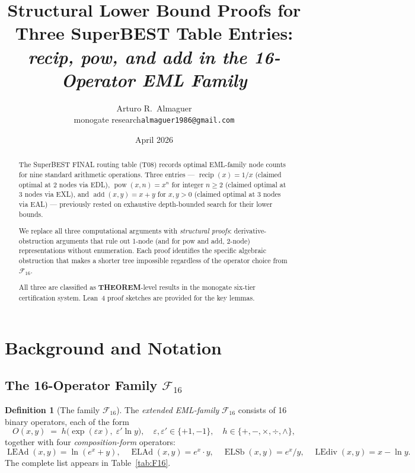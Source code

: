 \documentclass[12pt,a4paper]{article}
\title{Structural Lower Bound Proofs for Three SuperBEST Table Entries:\\
       \large\textit{recip, pow, and add in the 16-Operator EML Family}}
\author{Arturo R.\ Almaguer\\
  \small monogate research\quad\texttt{almaguer1986@gmail.com}}
\date{April 2026}
\theoremstyle{definition}
\newtheorem{definition}[theorem]{Definition}
\newcommand{\ELAd}{\operatorname{ELAd}}
\newcommand{\ELSb}{\operatorname{ELSb}}
\newcommand{\LEAd}{\operatorname{LEAd}}
\newcommand{\LEdiv}{\operatorname{LEdiv}}
\newcommand{\F}{\mathcal{F}_{16}}
\newcommand{\recip}{\operatorname{recip}}
\newcommand{\pow}{\operatorname{pow}}
\newcommand{\add}{\operatorname{add}}
\begin{document}
\maketitle

\begin{abstract}
The SuperBEST FINAL routing table (T08) records optimal EML-family node counts
for nine standard arithmetic operations.  Three entries --- $\recip(x)=1/x$
(claimed optimal at 2 nodes via EDL), $\pow(x,n)=x^n$ for integer $n\geq 2$
(claimed optimal at 3 nodes via EXL), and $\add(x,y)=x+y$ for $x,y>0$ (claimed
optimal at 3 nodes via EAL) --- previously rested on exhaustive depth-bounded
search for their lower bounds.

We replace all three computational arguments with \emph{structural proofs}:
derivative-obstruction arguments that rule out 1-node (and for pow and add,
2-node) representations without enumeration.  Each proof identifies the
specific algebraic obstruction that makes a shorter tree impossible regardless
of the operator choice from $\F$.

All three are classified as \textbf{THEOREM}-level results in the monogate
six-tier certification system.  Lean~4 proof sketches are provided for the
key lemmas.
\end{abstract}

\tableofcontents
\bigskip

\section{Background and Notation}
\label{sec:background}

\subsection{The 16-Operator Family \texorpdfstring{$\mathcal{F}_{16}$}{F16}}

\begin{definition}[The family $\F$]\label{def:F16}
The \emph{extended EML-family} $\F$ consists of 16 binary operators,
each of the form
\[
  O(x,y) \;=\; h\!\bigl(\exp(\varepsilon x),\; \varepsilon'\ln y\bigr),
  \quad \varepsilon,\varepsilon'\in\{+1,-1\},\quad
  h \in \{+,-,\times,\div,\wedge\},
\]
together with four \emph{composition-form} operators:
\[
  \LEAd(x,y) = \ln(e^x + y),\quad
  \ELAd(x,y) = e^x \cdot y,\quad
  \ELSb(x,y) = e^x / y,\quad
  \LEdiv(x,y) = x - \ln y.
\]
The complete list appears in Table~\ref{tab:F16}.
\end{definition}
\end{document}
